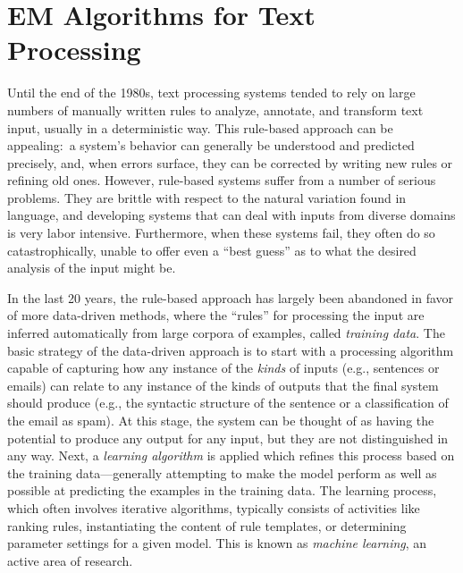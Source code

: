 \chapter{EM Algorithms for Text Processing}
\label{chapter6}

Until the end of the 1980s, text processing systems tended to rely on
large numbers of manually written rules to analyze, annotate, and
transform text input, usually in a deterministic way.  This rule-based
approach can be appealing:\ a system's behavior can generally be
understood and predicted precisely, and, when errors surface, they can
be corrected by writing new rules or refining old ones. However,
rule-based systems suffer from a number of serious problems.  They are
brittle with respect to the natural variation found in language, and
developing systems that can deal with inputs from diverse domains is
very labor intensive.  Furthermore, when these systems fail, they
often do so catastrophically, unable to offer even a ``best guess'' as
to what the desired analysis of the input might be.

In the last 20 years, the rule-based approach has largely been
abandoned in favor of more data-driven methods, where the ``rules''
for processing the input are inferred automatically from large corpora
of examples, called \emph{training data}.  The basic strategy of the
data-driven approach is to start with a processing algorithm capable
of capturing how any instance of the \emph{kinds} of inputs (e.g.,
sentences or emails) can relate to any instance of the kinds of
outputs that the final system should produce (e.g., the syntactic
structure of the sentence or a classification of the email as spam).
At this stage, the system can be thought of as having the potential to
produce any output for any input, but they are not distinguished in
any way.  Next, a \emph{learning algorithm} is applied which refines
this process based on the training data---generally attempting to make
the model perform as well as possible at predicting the examples in
the training data.  The learning process, which often involves
iterative algorithms, typically consists of activities like ranking
rules, instantiating the content of rule templates, or determining
parameter settings for a given model. This is known as \emph{machine
  learning}, an active area of research.


